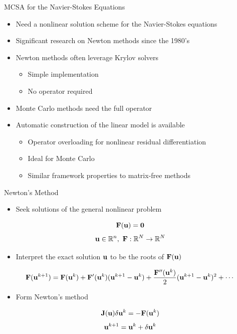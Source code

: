 \documentclass{beamer}
\begin{document}
\begin{frame}{MCSA for the Navier-Stokes Equations}

  \begin{itemize}
  \item Need a nonlinear solution scheme for the Navier-Stokes equations
    \bigskip
  \item Significant research on Newton methods since the 1980's
    \bigskip
  \item Newton methods often leverage Krylov solvers
    \begin{itemize}
    \item Simple implementation
    \item No operator required
    \end{itemize}
    \bigskip
  \item Monte Carlo methods need the full operator
    \bigskip
  \item Automatic construction of the linear model is available
    \begin{itemize}
    \item Operator overloading for nonlinear residual differentiation
    \item Ideal for Monte Carlo
    \item Similar framework properties to matrix-free methods
    \end{itemize}
  \end{itemize}

\end{frame}

\begin{frame}{Newton's Method}

  \begin{itemize}
  \item Seek solutions of the general nonlinear problem
  \end{itemize}

  \[
  \mathbf{F}(\mathbf{u}) = \mathbf{0}
  \]
  \[
  \mathbf{u} \in \mathbb{R}^n,\ \mathbf{F}:\mathbb{R}^N \rightarrow
  \mathbb{R}^N
  \]

  \begin{itemize}
  \item Interpret the exact solution $\mathbf{u}$ to be the roots of
    $\mathbf{F}(\mathbf{u})$
  \end{itemize}

  \[
  \mathbf{F}(\mathbf{u}^{k+1}) = \mathbf{F}(\mathbf{u}^{k}) +
  \mathbf{F}'(\mathbf{u}^{k})(\mathbf{u}^{k+1}-\mathbf{u}^{k}) +
  \frac{\mathbf{F}''(\mathbf{u}^{k})}{2}(\mathbf{u}^{k+1}-\mathbf{u}^{k})^2 + \cdots
  \]

  \begin{itemize}
  \item Form Newton's method
  \end{itemize}
  \[
  \mathbf{J}(\mathbf{u}) \delta \mathbf{u}^k = -\mathbf{F}(\mathbf{u}^{k})
  \]
  \[
  \mathbf{u}^{k+1} = \mathbf{u}^k + \delta \mathbf{u}^k
  \]

\end{frame}
\end{document}
